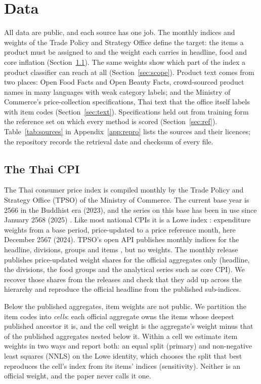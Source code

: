 \section{Data}\label{sec:data}

All data are public, and each source has one job. The monthly indices and weights of the
Trade Policy and Strategy Office define the target: the items a product must be assigned to
and the weight each carries in headline, food and core inflation
(Section~\ref{sec:cpi}). The same weights show which part of the index a product classifier
can reach at all (Section~\ref{sec:scope}). Product text comes from two places: Open Food
Facts and Open Beauty Facts, crowd-sourced product names in many languages with weak
category labels; and the Ministry of Commerce's price-collection specifications, Thai text
that the office itself labels with item codes (Section~\ref{sec:text}). Specifications held
out from training form the reference set on which every method is scored
(Section~\ref{sec:ref}). Table~\ref{tab:sources} in Appendix~\ref{app:repro} lists the sources
and their licences; the repository records the retrieval date and checksum of every file.

\subsection{The Thai CPI}\label{sec:cpi}

The Thai consumer price index is compiled monthly by the Trade Policy and Strategy Office
(TPSO) of the Ministry of Commerce. The current base year is 2566 in the Buddhist era (2023),
and the series on this base has been in use since January 2568 (2025)
\citep{tpso2025cpinote}. Like most national CPIs it is a Lowe index
\citep{imf2020cpimanual}: expenditure weights from a base period, price-updated to a price
reference month, here December 2567 (2024). TPSO's open API publishes monthly indices for the
headline, divisions, groups and items \citep{tpso2026api}, but no weights. The
monthly release publishes price-updated weight shares for the official aggregates only
(headline, the divisions, the food groups and the analytical series such as core CPI). We
recover those shares from the releases and check that they add up across the hierarchy and
reproduce the official headline from the published sub-indices.

Below the published aggregates, item weights are not public. We partition the item codes
into \emph{cells}: each official aggregate owns the items whose deepest published ancestor it
is, and the cell weight is the aggregate's weight minus that of the published aggregates
nested below it. Within a cell we estimate item weights in two ways and report both: an equal
split (primary) and non-negative least squares (NNLS) on the Lowe identity, which chooses the
split that best reproduces the cell's index from its items' indices (sensitivity). Neither is an
official weight, and the paper never calls it one.

